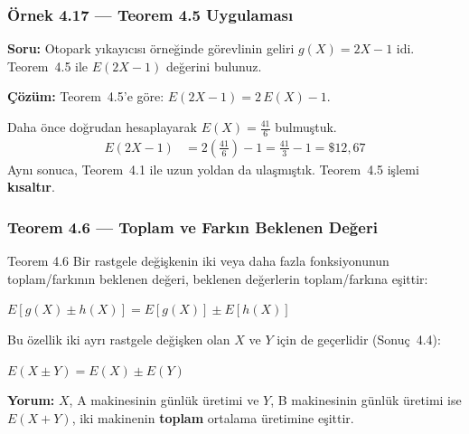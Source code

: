 ﻿\documentclass[light]{lutbeamer}
\begin{document}
\begin{frame}[fragile]
  \frametitle[Örnek 4.17]{Örnek 4.17 --- Teorem 4.5 Uygulaması}

  \smallskip
  \textbf{Soru:} Otopark yıkayıcısı örneğinde görevlinin geliri $g(X) = 2X - 1$ idi. Teorem~4.5 ile $E(2X - 1)$ değerini bulunuz.

  \medskip
  \textbf{Çözüm:} Teorem~4.5'e göre: $E(2X - 1) = 2\,E(X) - 1$.

  Daha önce doğrudan hesaplayarak $E(X) = \frac{41}{6}$ bulmuştuk.
  \begin{align*}
    E(2X - 1) &= 2\left(\frac{41}{6}\right) - 1 = \frac{41}{3} - 1 = \$12{,}67
  \end{align*}
  Aynı sonuca, Teorem~4.1 ile uzun yoldan da ulaşmıştık. Teorem~4.5 işlemi \textbf{kısaltır}.
\end{frame}

\begin{frame}[fragile]
  \frametitle{Teorem 4.6 --- Toplam ve Farkın Beklenen Değeri}
  \begin{center}
    \begin{minipage}{0.95\textwidth}
      \begin{block}{Teorem 4.6}
        Bir rastgele değişkenin iki veya daha fazla fonksiyonunun toplam/farkının beklenen değeri, beklenen değerlerin toplam/farkına eşittir:
        \begin{center}
          $E[g(X) \pm h(X)] = E[g(X)] \pm E[h(X)]$
        \end{center}
      \end{block}
    \end{minipage}
  \end{center}

  \medskip
  Bu özellik iki ayrı rastgele değişken olan $X$ ve $Y$ için de geçerlidir (Sonuç~4.4):
  \begin{center}
    $E(X \pm Y) = E(X) \pm E(Y)$
  \end{center}

  {\small \textbf{Yorum:} $X$, A makinesinin günlük üretimi ve $Y$, B makinesinin günlük üretimi ise $E(X+Y)$, iki makinenin \textbf{toplam} ortalama üretimine eşittir.}
\end{frame}
\end{document}
